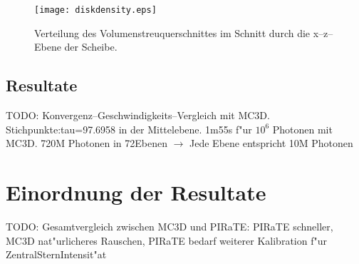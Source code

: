 		\begin{figure}
			\centering
			\texttt{[image: diskdensity.eps]}
			\caption{Verteilung des Volumenstreuquerschnittes im Schnitt durch die x--z--Ebene der Scheibe.}
			\label{fig:diskdensity}
		\end{figure}
	

	
	\subsection{Resultate}
	TODO: Konvergenz--Geschwindigkeits--Vergleich mit MC3D.
	Stichpunkte:tau=97.6958 in der Mittelebene. 1m55s f"ur $10^6$ Photonen mit MC3D. 720M Photonen in 72Ebenen $\rightarrow$ Jede Ebene entspricht 10M Photonen
	\section{Einordnung der Resultate}
	TODO: Gesamtvergleich zwischen MC3D und PIRaTE: PIRaTE schneller, MC3D nat"urlicheres Rauschen, PIRaTE bedarf weiterer Kalibration f"ur ZentralSternIntensit"at